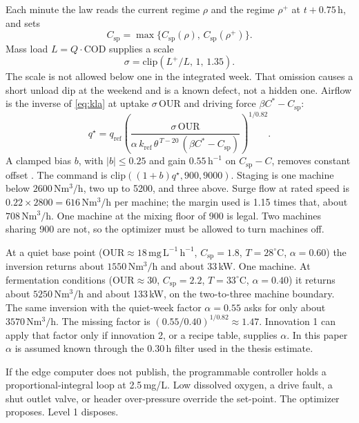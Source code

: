 \documentclass[11pt,a4paper]{article}
\begin{document}
Each minute the law reads the current regime \(\rho\) and the regime \(\rho^{+}\) at \(t+0.75\,\mathrm{h}\), and sets
\begin{equation}
C_{\mathrm{sp}}=\max\big\{C_{\mathrm{sp}}(\rho),\,C_{\mathrm{sp}}(\rho^{+})\big\}.
\end{equation}
Mass load \(L=Q\cdot\mathrm{COD}\) supplies a scale
\begin{equation}
\sigma=\mathrm{clip}(L^{+}/L,\,1,\,1.35).
\end{equation}
The scale is not allowed below one in the integrated week. That omission causes a short unload dip at the weekend and is a known defect, not a hidden one. Airflow is the inverse of \eqref{eq:kla} at uptake \(\sigma\,\mathrm{OUR}\) and driving force \(\beta C^{*}-C_{\mathrm{sp}}\):
\begin{equation}
\label{eq:inv}
q^{\star}
=
q_{\mathrm{ref}}
\left(
\frac{\sigma\,\mathrm{OUR}}
{\alpha\,k_{\mathrm{ref}}\,\theta^{\,T-20}\,(\beta C^{*}-C_{\mathrm{sp}})}
\right)^{1/0.82}.
\end{equation}
A clamped bias \(b\), with \(|b|\le 0.25\) and gain \(0.55\,\mathrm{h^{-1}}\) on \(C_{\mathrm{sp}}-C\), removes constant offset \cite{pannocchia2003}. The command is \(\mathrm{clip}((1+b)q^{\star},900,9000)\). Staging is one machine below \(2600\,\mathrm{Nm^{3}/h}\), two up to 5200, and three above. Surge flow at rated speed is \(0.22\times 2800=616\,\mathrm{Nm^{3}/h}\) per machine; the margin used is 1.15 times that, about \(708\,\mathrm{Nm^{3}/h}\). One machine at the mixing floor of 900 is legal. Two machines sharing 900 are not, so the optimizer must be allowed to turn machines off.

At a quiet base point (\(\mathrm{OUR}\approx 18\,\mathrm{mg\,L^{-1}\,h^{-1}}\), \(C_{\mathrm{sp}}=1.8\), \(T=28^{\circ}\mathrm{C}\), \(\alpha=0.60\)) the inversion returns about \(1550\,\mathrm{Nm^{3}/h}\) and about 33\,kW. One machine. At fermentation conditions (\(\mathrm{OUR}\approx 30\), \(C_{\mathrm{sp}}=2.2\), \(T=33^{\circ}\mathrm{C}\), \(\alpha=0.40\)) it returns about \(5250\,\mathrm{Nm^{3}/h}\) and about 133\,kW, on the two-to-three machine boundary. The same inversion with the quiet-week factor \(\alpha=0.55\) asks for only about \(3570\,\mathrm{Nm^{3}/h}\). The missing factor is \((0.55/0.40)^{1/0.82}\approx 1.47\). Innovation 1 can apply that factor only if innovation 2, or a recipe table, supplies \(\alpha\). In this paper \(\alpha\) is assumed known through the 0.30\,h filter used in the thesis estimate.

If the edge computer does not publish, the programmable controller holds a proportional-integral loop at 2.5\,mg/L. Low dissolved oxygen, a drive fault, a shut outlet valve, or header over-pressure override the set-point. The optimizer proposes. Level 1 disposes.
\end{document}
